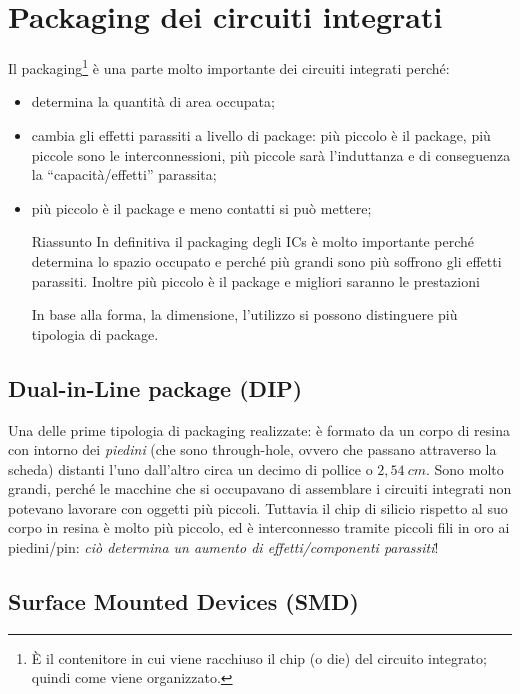 \documentclass[
]{book}
\providecommand{\tightlist}{%
  \setlength{\itemsep}{0pt}\setlength{\parskip}{0pt}}
\begin{document}
\section{Packaging dei circuiti
integrati}\label{packaging-dei-circuiti-integrati}

Il packaging\footnote{È il contenitore in cui viene racchiuso il chip (o
  die) del circuito integrato; quindi come viene organizzato.} è una
parte molto importante dei circuiti integrati perché:

\begin{itemize}
\tightlist
\item
  determina la quantità di area occupata;
\item
  cambia gli effetti parassiti a livello di package: più piccolo è il
  package, più piccole sono le interconnessioni, più piccole sarà
  l'induttanza e di conseguenza la ``capacità/effetti'' parassita;
\item
  più piccolo è il package e meno contatti si può mettere;

  \begin{redbox}{Riassunto}
  In definitiva il packaging degli ICs è molto importante perché determina lo spazio occupato e perché più grandi sono più soffrono gli effetti parassiti. Inoltre più piccolo è il package e migliori saranno le prestazioni
  \end{redbox}

  In base alla forma, la dimensione, l'utilizzo si possono distinguere
  più tipologia di package.
\end{itemize}

\subsection{Dual-in-Line package (DIP)}\label{dual-in-line-package-dip}

Una delle prime tipologia di packaging realizzate: è formato da un corpo
di resina con intorno dei \emph{piedini} (che sono through-hole, ovvero
che passano attraverso la scheda) distanti l'uno dall'altro circa un
decimo di pollice o \(2,54\:cm\). Sono molto grandi, perché le macchine
che si occupavano di assemblare i circuiti integrati non potevano
lavorare con oggetti più piccoli. Tuttavia il chip di silicio rispetto
al suo corpo in resina è molto più piccolo, ed è interconnesso tramite
piccoli fili in oro ai piedini/pin: \emph{ciò determina un aumento di
effetti/componenti parassiti}!

\subsection{Surface Mounted Devices
(SMD)}\label{surface-mounted-devices-smd}
\end{document}
